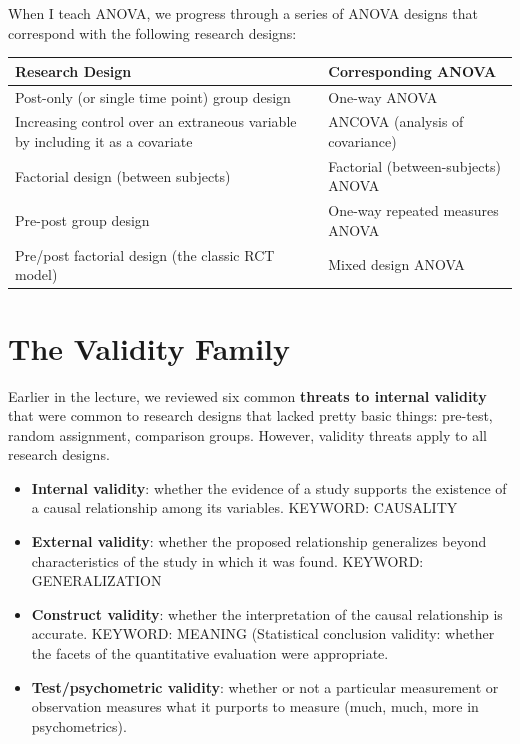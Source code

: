 \documentclass[
  english,
]{book}
\providecommand{\tightlist}{%
  \setlength{\itemsep}{0pt}\setlength{\parskip}{0pt}}
\begin{document}
When I teach ANOVA, we progress through a series of ANOVA designs that correspond with the following research designs:

\begin{longtable}[]{@{}
  >{\raggedright\arraybackslash}p{}
  >{\raggedright\arraybackslash}p{}@{}}
\toprule
Research Design & Corresponding ANOVA \\
\midrule
\endhead
Post-only (or single time point) group design & One-way ANOVA \\
Increasing control over an extraneous variable by including it as a covariate & ANCOVA (analysis of covariance) \\
Factorial design (between subjects) & Factorial (between-subjects) ANOVA \\
Pre-post group design & One-way repeated measures ANOVA \\
Pre/post factorial design (the classic RCT model) & Mixed design ANOVA \\
\bottomrule
\end{longtable}

\hypertarget{the-validity-family}{%
\section{The Validity Family}\label{the-validity-family}}

Earlier in the lecture, we reviewed six common \textbf{threats to internal validity} that were common to research designs that lacked pretty basic things: pre-test, random assignment, comparison groups. However, validity threats apply to all research designs.

\begin{itemize}
\tightlist
\item
  \textbf{Internal validity}: whether the evidence of a study supports the existence of a causal relationship among its variables. KEYWORD: CAUSALITY
\item
  \textbf{External validity}: whether the proposed relationship generalizes beyond characteristics of the study in which it was found. KEYWORD: GENERALIZATION
\item
  \textbf{Construct validity}: whether the interpretation of the causal relationship is accurate. KEYWORD: MEANING
  (Statistical conclusion validity: whether the facets of the quantitative evaluation were appropriate.
\item
  \textbf{Test/psychometric validity}: whether or not a particular measurement or observation measures what it purports to measure (much, much, more in psychometrics).
\end{itemize}
\end{document}
